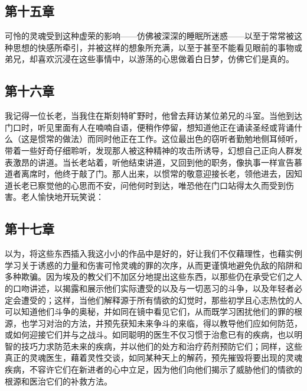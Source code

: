 
\subsection{第十五章}

\par

可怜的灵魂受到这种虚荣的影响——仿佛被深深的睡眠所迷惑——以至于常常被这种思想的快感所牵引，并被这样的想象所充满，以至于甚至不能看见眼前的事物或弟兄，却喜欢沉浸在这些事情中，以游荡的心思做着白日梦，仿佛它们是真的。\par


\subsection{第十六章}

\par

我记得一位长老，当我住在斯刻特旷野时，他曾去拜访某位弟兄的斗室。当他到达门口时，听见里面有人在喃喃自语，便稍作停留，想知道他正在诵读圣经或背诵什么（这是惯常的做法）而同时他正在工作。这位最出色的窃听者勤勉地侧耳倾听，带着一些好奇仔细聆听，发现那人被这种精神的攻击所诱导，幻想自己正向人群发表激昂的讲道。当长老站着，听他结束讲道，又回到他的职务，像执事一样宣告慕道者离席时，他终于敲了门。那人出来，以惯常的敬意迎接长老，领他进去，因知道长老已察觉他的心思而不安，问他何时到达，唯恐他在门口站得太久而受到伤害。老人愉快地开玩笑说：\par


\subsection{第十七章}

\par

以为，将这些东西插入我这小小的作品中是好的，好让我们不仅藉理性，也藉实例学习关于诱惑的力量和伤害可怜灵魂的罪的次序，从而更谨慎地避免仇敌的陷阱和多种欺骗。因为埃及的教父们不加区分地提出这些东西，以那些仍在承受它们之人的口吻讲述，以揭露和展示他们实际遭受的以及与一切恶习的斗争，以及年轻者必定会遭受的；这样，当他们解释源于所有情欲的幻觉时，那些初学且心志热忱的人可以知道他们斗争的奥秘，并如同在镜中看见它们，从而既学习困扰他们的罪的根源，也学习对治的方法，并预先获知未来争斗的来临，得以教导他们应如何防范，或如何迎接它们并与之战斗。如同聪明的医生不仅习惯于治愈已有的疾病，也以明智的技巧力求防范未来的疾病，并以他们的处方和治疗药剂预防它们；同样，这些真正的灵魂医生，藉着灵性交谈，如同某种天上的解药，预先摧毁将要出现的灵魂疾病，不容许它们在新进者的心中立足，因为他们向他们揭示了威胁他们的情欲的根源和医治它们的补救方法。\par

